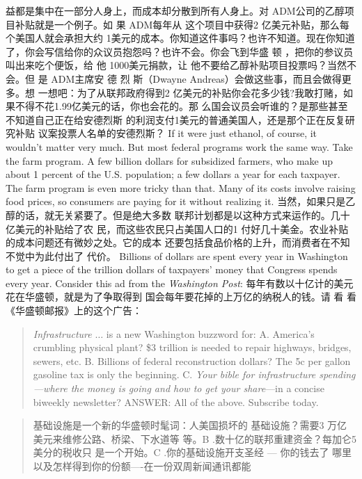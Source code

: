 \begin{paracol}{2}
益都是集中在一部分人身上，而成本却分散到所有人身上。对
ADM公司的乙醇项目补贴就是一个例子。如 果 ADM每年从
这个项目中获得2 亿美元补贴，那么每个美国人就会承担大约
1美元的成本。你知道这件事吗？也许不知道。现在你知道
了，你会写信给你的众议员抱怨吗？也许不会。你会飞到华盛
顿 ，把你的参议员叫出来吃个便饭，给 他 1000美元捐款，让
他不要给乙醇补贴项目投票吗？当然不会。但 是 ADM主席安
德 烈 斯（Dwayne Andreas）会做这些事，而且会做得更多。想
一想吧：为了从联邦政府得到2 亿美元的补贴你会花多少钱?我敢打赌，如果不得不花1.99亿美元的话，你也会花的。那
么国会议员会听谁的？是那些甚至不知道自己正在给安德烈斯
的利润支付1美元的普通美国人，还是那个正在反复研究补贴
议案投票人名单的安德烈斯？
\switchcolumn*
If it were just ethanol, of course, it wouldn't matter very
much. But most federal programs work the same way. Take the
farm program. A few billion dollars for subsidized farmers, who
make up about 1 percent of the U.S. population; a few dollars a
year for each taxpayer. The farm program is even more tricky
than that. Many of its costs involve raising food prices, so consumers are paying for it without realizing it.
\switchcolumn
当然，如果只是乙醇的话，就无关紧要了。但是绝大多数
联邦计划都是以这种方式来运作的。几十亿美元的补贴给了农
民，而这些农民只占美国人口的1%
付好几十美金。农业补贴的成本问题还有微妙之处。它的成本
还要包括食品价格的上升，而消费者在不知不觉中为此付出了
代价。
\switchcolumn*
Billions of dollars are spent every year in Washington to get
a piece of the trillion dollars of taxpayers' money that Congress
spends every year. Consider this ad from the \textit{Washington Post}:
\switchcolumn
每年有数以十亿计的美元花在华盛顿，就是为了争取得到
国会每年要花掉的上万亿的纳税人的钱。请 看 看 《华盛顿邮报》上的这个广告：
\switchcolumn*
\begin{quote}
\textit{Infrastructure} $\ldots$ is a new Washington buzzword for: A. America's crumbling physical plant? \$3 trillion is needed to repair
highways, bridges, sewers, etc. B. Billions of federal reconstruction dollars? The 5c per gallon gasoline tax is only the beginning. C. \textit{Your bible for infrastructure spending---where the money is
going and how to get your share}---in a concise biweekly newsletter?
ANSWER: All of the above. Subscribe today.
\end{quote}
\switchcolumn
\begin{quote}
基础设施是一个新的华盛顿时髦词：人美国损坏的
基础设施？需要3 万亿美元来维修公路、桥梁、下水道等
等。B .数十亿的联邦重建资金？每加仑5 美分的税收只
是一个开始。C .你的基础设施开支圣经 --- 你的钱去了
哪里以及怎样得到你的份额----在一份双周新闻通讯都能

\end{quote}
\end{paracol}
